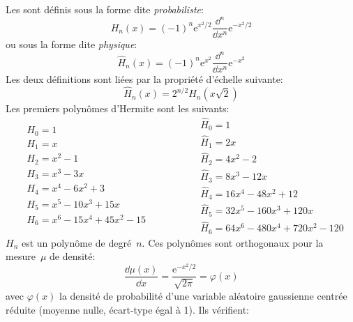 Les  sont définis sous la forme dite \emph{probabiliste}: 
\begin{equation}
 H_n(x)=(-1)^n \mathrm{e}^{x^2/2}\frac{\dd ^n}{\dd x^n}\mathrm{e}^{-x^2/2}
\end{equation}
ou sous la forme dite \emph{physique}: 
\begin{equation}
 \widehat{H}_n(x)=(-1)^n \mathrm{e}^{x^2}\frac{\dd^n}{\dd x^n}\mathrm{e}^{-x^2} 
\end{equation}
Les deux définitions sont liées par la propriété d'échelle suivante:
\begin{equation}
\widehat{H}_n(x) = 2^{n/2}H_n(x\sqrt{2})
\end{equation}
Les premiers polynômes d'Hermite sont les suivants:
\begin{equation}
\begin{aligned}
&H_0=1\\
&H_1=x\\
&H_2=x^2-1\\
&H_3=x^3-3x\\
&H_4=x^4-6x^2+3\\
&H_5=x^5-10x^3+15x\\
&H_6=x^6-15x^4+45x^2-15
\end{aligned}
\qquad\qquad\begin{aligned}
&\widehat{H}_0=1\\
&\widehat{H}_1=2x\\
&\widehat{H}_2=4x^2-2\\
&\widehat{H}_3=8x^3-12x\\
&\widehat{H}_4=16x^4-48x^2+12\\
&\widehat{H}_5=32x^5-160x^3+120x\\
&\widehat{H}_6=64x^6-480x^4+720x^2-120
\end{aligned}
\end{equation}
$H_n$ est un polynôme de degré~$n$. Ces polynômes sont orthogonaux pour la mesure~$\mu$ de densité: 
\begin{equation}
 \frac{\dd \mu(x)}{\dd x} = \frac{\mathrm{e}^{-x^2/2}}{\sqrt{2\pi}} = \varphi(x) 
\end{equation}
avec $\varphi(x)$ la densité de probabilité d'une variable aléatoire gaussienne centrée réduite (moyenne nulle, écart-type égal à 1). 
Ils vérifient: 
